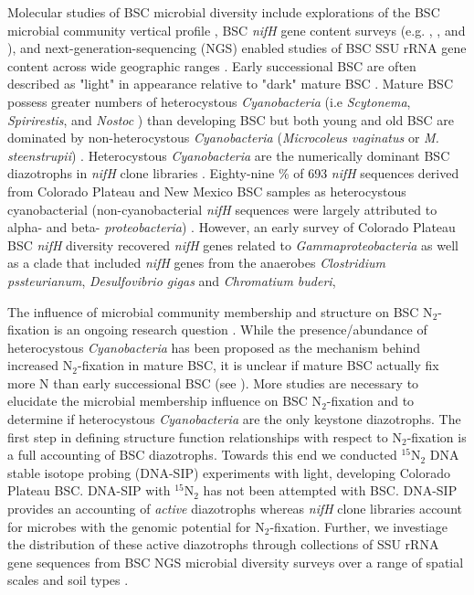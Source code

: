 Molecular studies of BSC microbial diversity include explorations of the BSC
microbial community vertical profile \citep{Garcia_Pichel_2003}, BSC
\textit{nifH} gene content surveys (e.g. \citet{14766579}, \citet{Yeager_2012},
\citet{Yeager} and \citet{Steppe_1996}), and next-generation-sequencing (NGS)
enabled studies of BSC SSU rRNA gene content across wide geographic ranges
\citep{Garcia_Pichel_2013, Steven_2013}. Early successional  BSC are often
described as "light" in appearance relative to "dark" mature BSC
\citep{Belnap_2002, 14766579}. Mature BSC possess greater numbers of
heterocystous \textit{Cyanobacteria} (i.e \textit{Scytonema},
\textit{Spirirestis}, and \textit{Nostoc} \citep{Yeager, Yeager_2012}) than
developing BSC but both young and old BSC are dominated by non-heterocystous
\textit{Cyanobacteria} (\textit{Microcoleus vaginatus} or \textit{M.
steenstrupii}) \citep{14766579, Garcia_Pichel_2013}.  Heterocystous
\textit{Cyanobacteria} are the numerically dominant BSC diazotrophs in
\textit{nifH} clone libraries \citep{Yeager, 14766579, Yeager_2012}.
Eighty-nine \% of 693 \textit{nifH} sequences derived from Colorado Plateau and
New Mexico BSC samples as heterocystous cyanobacterial (non-cyanobacterial
\textit{nifH} sequences were largely attributed to alpha- and beta-
\textit{proteobacteria}) \citet{Yeager}. However, an early survey of Colorado
Plateau BSC \textit{nifH} diversity recovered \textit{nifH} genes related to
\textit{Gammaproteobacteria} as well as a clade that included \textit{nifH}
genes from the anaerobes \textit{Clostridium pssteurianum},
\textit{Desulfovibrio gigas} and \textit{Chromatium buderi},

The influence of microbial community membership and structure on BSC
N$_{2}$-fixation is an ongoing research question \citep{Belnap28062013}. While
the presence/abundance of heterocystous \textit{Cyanobacteria} has been
proposed as the mechanism behind increased N$_{2}$-fixation in mature BSC, it
is unclear if mature BSC actually fix more N than early successional BSC (see
\citet{15643930}). More studies are necessary to elucidate the microbial
membership influence on BSC N$_{2}$-fixation and to determine if heterocystous
\textit{Cyanobacteria} are the only keystone diazotrophs. The first step in
defining structure function relationships with respect to N$_{2}$-fixation is a
full accounting of BSC diazotrophs. Towards this end we conducted
$^{15}$N$_{2}$ DNA stable isotope probing (DNA-SIP) experiments with light,
developing Colorado Plateau BSC.  DNA-SIP with $^{15}$N$_{2}$ has not been
attempted with BSC. DNA-SIP provides an accounting of \textit{active}
diazotrophs whereas \textit{nifH} clone libraries account for microbes with the
genomic potential for N$_{2}$-fixation.  Further, we investiage the
distribution of these active diazotrophs through collections of SSU rRNA
gene sequences from BSC NGS microbial diversity surveys over a range of spatial
scales and soil types \citep{Garcia_Pichel_2013, Steven_2013}. 

